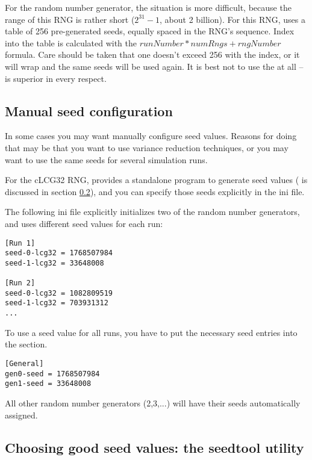 For the  random number generator, the situation is more difficult,
because the range of this RNG is rather short ($2^31-1$, about 2 billion).
For this RNG, {\opp} uses a table of 256 pre-generated seeds, equally spaced
in the RNG's sequence. Index into the table is calculated with the
$runNumber*numRngs + rngNumber$ formula. Care should be taken that
one doesn't exceed 256 with the index, or it will wrap and the
same seeds will be used again. It is best not to use the 
at all --  is superior in every respect.


\subsection{Manual seed configuration}

In some cases you may want manually configure seed values.
Reasons for doing that may be that you want to use variance reduction
techniques, or you may want to use the same seeds for several simulation
runs.

For the cLCG32 RNG, {\opp} provides a standalone program to generate
seed values ( is discussed in section
\ref{sec:ch-run-sim:seedtool}), and you can specify those seeds explicitly
in the ini file.

The following ini file explicitly initializes two of the random
number generators, and uses different seed values for each run:

\begin{verbatim}
[Run 1]
seed-0-lcg32 = 1768507984
seed-1-lcg32 = 33648008

[Run 2]
seed-0-lcg32 = 1082809519
seed-1-lcg32 = 703931312
...
\end{verbatim}

To use a seed value for all runs, you have to put the necessary
seed entries into the \ttt{[General]} section.

\begin{verbatim}
[General]
gen0-seed = 1768507984
gen1-seed = 33648008
\end{verbatim}

All other random number generators (2,3,...) will have their seeds
automatically assigned.


\subsection{Choosing good seed values: the seedtool utility}
\label{sec:ch-run-sim:seedtool}

